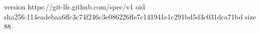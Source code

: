 version https://git-lfs.github.com/spec/v1
oid sha256:114eadebaa6ffc3c74f246c3e086226ffe7c141941e1c291bd5d3c031dca71bd
size 88
